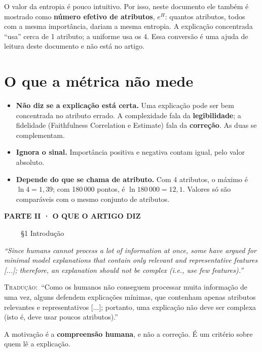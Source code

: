\documentclass[11pt,a4paper]{article}
\newcommand{\pagechip}[1]{{\setlength{\fboxsep}{1.5pt}\colorbox{cAcc}{\textcolor{white}{\scriptsize\texttt{#1}}}}}
\newcommand{\partbar}[1]{\par\vspace{1.2em}\noindent\colorbox{black!80}{\parbox{\dimexpr\linewidth-2\fboxsep}{\color{white}\bfseries\sffamily\MakeUppercase{#1}}}\par\vspace{0.4em}}
\newenvironment{origquote}{\par\itshape\small}{\par}
\newenvironment{tradquote}{\par\small\textsc{Tradução:}\ }{\par}
\newcommand{\explab}[1]{\par\smallskip{\small\color{cAcc}\textbf{\MakeUppercase{#1}}}\par}
\begin{document}
O valor da entropia é pouco intuitivo. Por isso, neste documento ele também é mostrado como \textbf{número efetivo de atributos}, $e^{H}$: quantos atributos, todos com a mesma importância, dariam a mesma entropia. A explicação concentrada “usa” cerca de 1 atributo; a uniforme usa os 4. Essa conversão é uma ajuda de leitura deste documento e não está no artigo.

\section{O que a métrica não mede}
\begin{itemize}
\item \textbf{Não diz se a explicação está certa.} Uma explicação pode ser bem concentrada no atributo errado. A complexidade fala da \textbf{legibilidade}; a fidelidade (Faithfulness Correlation e Estimate) fala da \textbf{correção}. As duas se complementam.
\item \textbf{Ignora o sinal.} Importância positiva e negativa contam igual, pelo valor absoluto.
\item \textbf{Depende do que se chama de atributo.} Com 4 atributos, o máximo é $\ln 4 = 1{,}39$; com 180\,000 pontos, é $\ln 180\,000 = 12{,}1$. Valores só são comparáveis com o mesmo conjunto de atributos.
\end{itemize}

\partbar{Parte II · O que o artigo diz}

\begin{citacard}{\pagechip{p. 1} §1 Introdução}
\begin{origquote}“Since humans cannot process a lot of information at once, some have argued for minimal model explanations that contain only relevant and representative features [...]; therefore, an explanation should not be complex (i.e., use few features).”\end{origquote}
\begin{tradquote}“Como os humanos não conseguem processar muita informação de uma vez, alguns defendem explicações mínimas, que contenham apenas atributos relevantes e representativos [...]; portanto, uma explicação não deve ser complexa (isto é, deve usar poucos atributos).”\end{tradquote}
\explab{Explicação}
A motivação é a \textbf{compreensão humana}, e não a correção. É um critério sobre quem lê a explicação.
\end{citacard}
\end{document}
